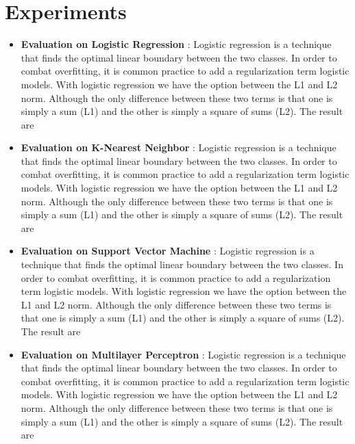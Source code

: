 \documentclass[a4paper,oneside]{article}
\begin{document}
\section{Experiments}
\begin{itemize}
\item \textbf{Evaluation on Logistic Regression} : Logistic regression is a technique that finds the optimal linear boundary between the two classes. In order to combat overfitting, it is common practice to add a regularization term logistic models. With logistic regression we have the option between the L1 and L2 norm. Although the only difference between these two terms is that one is simply a sum (L1) and the other is simply a square of sums (L2). The result are\\

\item \textbf{Evaluation on K-Nearest Neighbor} : Logistic regression is a technique that finds the optimal linear boundary between the two classes. In order to combat overfitting, it is common practice to add a regularization term logistic models. With logistic regression we have the option between the L1 and L2 norm. Although the only difference between these two terms is that one is simply a sum (L1) and the other is simply a square of sums (L2). The result are\\

\item \textbf{Evaluation on Support Vector Machine} : Logistic regression is a technique that finds the optimal linear boundary between the two classes. In order to combat overfitting, it is common practice to add a regularization term logistic models. With logistic regression we have the option between the L1 and L2 norm. Although the only difference between these two terms is that one is simply a sum (L1) and the other is simply a square of sums (L2). The result are\\

\item \textbf{Evaluation on Multilayer Perceptron} : Logistic regression is a technique that finds the optimal linear boundary between the two classes. In order to combat overfitting, it is common practice to add a regularization term logistic models. With logistic regression we have the option between the L1 and L2 norm. Although the only difference between these two terms is that one is simply a sum (L1) and the other is simply a square of sums (L2). The result are
\end{itemize}
\end{document}
